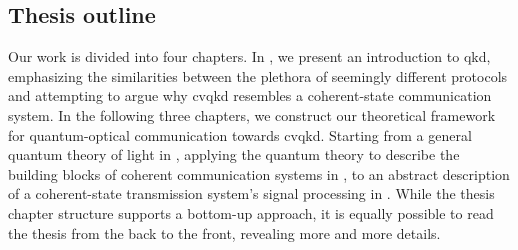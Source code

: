 \subsection*{Thesis outline}

Our work is divided into four chapters.
In , we present an introduction to \gls{qkd}, emphasizing the similarities between the plethora of seemingly different protocols and attempting to argue why \gls{cvqkd} resembles a coherent-state communication system.
In the following three chapters, we construct our theoretical framework for quantum-optical communication towards \gls{cvqkd}.
Starting from a general quantum theory of light in , applying the quantum theory to describe the building blocks of coherent communication systems in , to an abstract description of a coherent-state transmission system's signal processing in .
While the thesis chapter structure supports a bottom-up approach, it is equally possible to read the thesis from the back to the front, revealing more and more details.